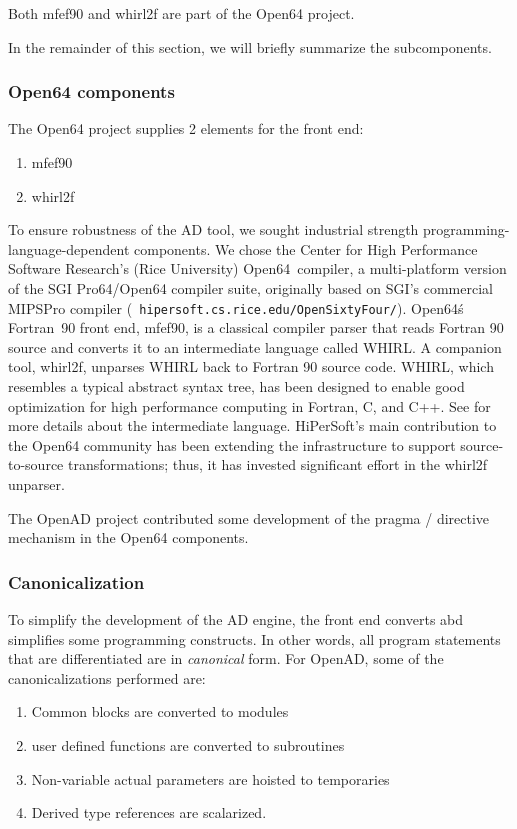 \documentclass[acmtocl,acmnow]{acmtrans2m}
\newcommand{\OpenSixtyFour}{Open64}
\begin{document}
Both mfef90 and whirl2f are part of the Open64 project.

In the remainder of this section, we will briefly summarize the
subcomponents.

\subsubsection*{Open64 components}
The Open64 project supplies 2 elements for the front end:
   \begin{enumerate}
      \item mfef90
      \item whirl2f
   \end{enumerate}

To ensure robustness of the AD tool, we sought industrial strength
programming-language-dependent components.  We chose the Center for
High Performance Software Research's (Rice University) \OpenSixtyFour\
compiler, a multi-platform version of the SGI Pro64/Open64 compiler
suite, originally based on SGI's commercial MIPSPro compiler ({\tt
hipersoft.cs.rice.edu/OpenSixtyFour/}).  \OpenSixtyFour\'s Fortran~90
front end, mfef90, is a classical compiler parser that reads Fortran
90 source and converts it to an intermediate language called WHIRL.  A
companion tool, whirl2f, unparses WHIRL back to Fortran 90 source
code.  WHIRL, which resembles a typical abstract syntax tree, has been
designed to enable good optimization for high performance computing in
Fortran, C, and C++. See \cite{whirl-stuff} for more details about the
intermediate language. HiPerSoft's main contribution to the Open64
community has been extending the infrastructure to support
source-to-source transformations; thus, it has invested significant
effort in the whirl2f unparser.

The OpenAD project contributed some development of the pragma /
directive mechanism in the Open64 components.

\subsubsection*{Canonicalization}
To simplify the development of the AD engine, the front end converts
abd simplifies some programming constructs. In other words, all
program statements that are differentiated are in \emph{canonical}
form. For OpenAD, some of the canonicalizations performed are:

   \begin{enumerate}
      \item Common blocks are converted to modules
      \item user defined functions are converted to subroutines
      \item Non-variable actual parameters are hoisted to
            temporaries
      \item Derived type references are scalarized.
   \end{enumerate}
\end{document}
